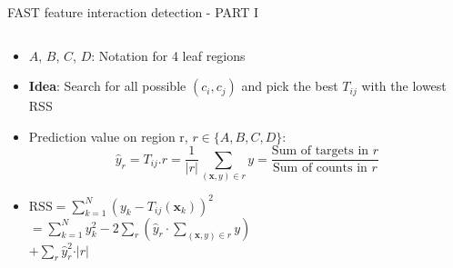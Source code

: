 \documentclass[11pt,compress,t,notes=noshow, aspectratio=169, xcolor=table]{beamer}
\begin{document}
\begin{frame}{FAST feature interaction detection - PART I}
\begin{columns}[T, totalwidth=\textwidth]
\begin{column}{0.6\textwidth}
\begin{itemize}
    \item $A$, $B$, $C$, $D$: Notation for 4 leaf regions
    \item \textbf{Idea}: Search for all possible $(c_i, c_j)$ and pick the best $T_{ij}$ with the lowest RSS
    \item Prediction value on region r, $r\in\{A, B, C, D\}$:
    $$\hat{y}_r=T_{ij}.r=\frac{1}{\vert r\vert}\sum_{(\mathbf{x},y)\in r}y=\frac{\text{Sum of targets in }r}{\text{Sum of counts in }r}$$
    \item $\text{RSS}=\sum_{k=1}^N(y_k-T_{ij}(\mathbf{x}_k))^2$ \\
    \qquad\;$=\sum_{k=1}^Ny_k^2-2\sum_r\left(\hat{y}_r\cdot\sum_{(\mathbf{x},y)\in r}y\right)$\\
    \qquad\;\;\;\;$+\sum_r\hat{y}_r^2\cdot\vert r\vert$
\end{itemize}
\end{column}
\end{columns}

\end{frame}
\end{document}
